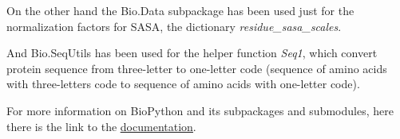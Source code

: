 On the other hand the Bio.Data subpackage has been used just for the normalization factors for SASA, the dictionary \textit{residue\_sasa\_scales}. 

And Bio.SeqUtils has been used for the helper function \textit{Seq1}, which convert protein sequence from three-letter to one-letter code (sequence of amino acids with three-letters code to sequence of amino acids with one-letter code).

For more information on BioPython and its subpackages and submodules, here there is the link to the  \underline{\href{https://biopython.org/docs/dev/api/index.html}{documentation}}.